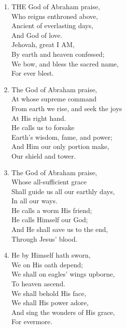 \begin{enumerate}
    \item THE God of Abraham praise, \\
        Who reigns enthroned above, \\
        Ancient of everlasting days, \\
        And God of love. \\
        Jehovah, great I AM, \\
        By earth and heaven confessed; \\
        We bow, and bless the sacred name, \\
        For ever blest.

    \item The God of Abraham praise, \\
        At whose supreme command \\
        From earth we rise, and seek the joys \\
        At His right hand. \\
        He calls us to forsake \\
        Earth's wisdom, fame, and power; \\
        And Him our only portion make, \\
        Our shield and tower.

    \item The God of Abraham praise, \\
        Whose all-sufficient grace \\
        Shall guide us all our earthly days, \\
        In all our ways. \\
        He calls a worm His friend; \\
        He calls Himself our God; \\
        And He shall save us to the end, \\
        Through Jesus' blood.

    \item He by Himself hath sworn, \\
        We on His oath depend; \\
        We shall on eagles' wings upborne, \\
        To heaven ascend. \\
        We shall behold His face, \\
        We shall His power adore, \\
        And sing the wonders of His grace, \\
        For evermore.


\end{enumerate}
